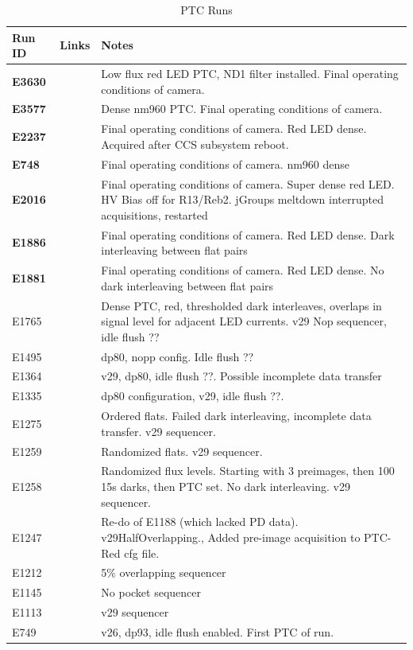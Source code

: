 \begin{table}[H]\label{table:runs_PTCs}
\centering
\caption{PTC Runs}
\begin{tabular}{|p{1.5cm}|p{2.9cm}|p{9cm}|}
\hline

Run ID & Links & Notes \\ \hline

\textbf{E3630} & & Low flux red LED PTC, ND1 filter installed. Final operating conditions of camera.\\ \hline
\textbf{E3577} & & Dense nm960 PTC. Final operating conditions of camera.\\ \hline
\textbf{E2237} & & Final operating conditions of camera. Red LED dense. Acquired after CCS subsystem reboot. \\ \hline
\textbf{E748} & & Final operating conditions of camera. nm960 dense \\ \hline
\textbf{E2016} & & Final operating conditions of camera. Super dense red LED. HV Bias off for R13/Reb2. jGroups meltdown interrupted acquisitions, restarted \\ \hline
\textbf{E1886} & & Final operating conditions of camera. Red LED dense. Dark interleaving between flat pairs \\ \hline
\textbf{E1881} & & Final operating conditions of camera. Red LED dense. No dark interleaving between flat pairs \\ \hline
E1765 & & Dense PTC, red, thresholded dark interleaves, overlaps in signal level for adjacent LED currents. v29 Nop sequencer, idle flush ??\\ \hline
E1495 & & dp80, nopp config. Idle flush ??\\ \hline
E1364 & & v29, dp80, idle flush ??. Possible incomplete data transfer\\ \hline
E1335 & & dp80 configuration, v29, idle flush ??.\\ \hline
E1275 & & Ordered flats. Failed dark interleaving, incomplete data transfer. v29 sequencer.\\ \hline
E1259 & & Randomized flats. v29 sequencer. \\ \hline
E1258 & & Randomized flux levels. Starting with 3 preimages, then 100 15s darks, then PTC set. No dark interleaving. v29 sequencer. \\ \hline
E1247 & & Re-do of E1188 (which lacked PD data). v29HalfOverlapping., Added pre-image acquisition to PTC-Red cfg file. \\ \hline
E1212 & & 5\% overlapping sequencer\\ \hline
E1145 & & No pocket sequencer\\ \hline
E1113 & & v29 sequencer\\ \hline
E749 & & v26, dp93, idle flush enabled. First PTC of run. \\ \hline
\end{tabular}
\end{table}

